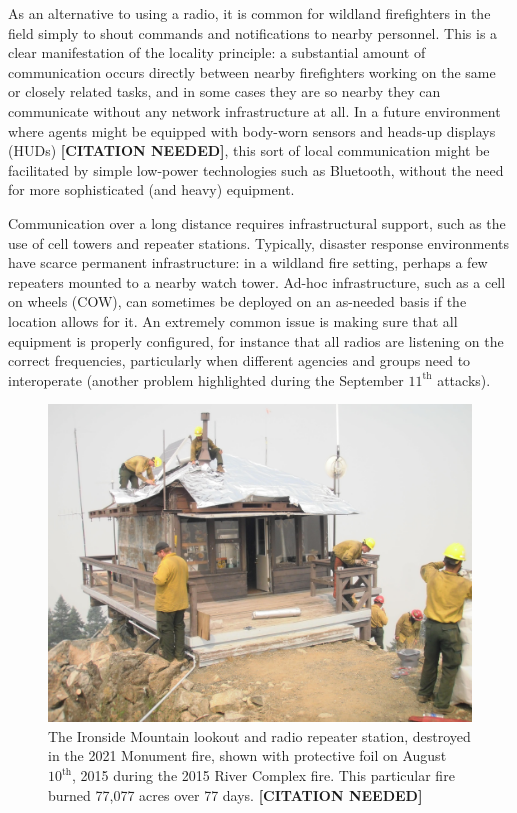 \documentclass[]             %
{NASA}                       %
\theoremstyle{definition}
\newcommand{\citationneeded}{\textbf{[CITATION NEEDED]}}
\begin{document}
As an alternative to using a radio, it is common for wildland
firefighters in the field simply to shout commands and notifications
to nearby personnel. This is a clear manifestation of the locality
principle: a substantial amount of communication occurs directly
between nearby firefighters working on the same or closely related
tasks, and in some cases they are so nearby they can communicate
without any network infrastructure at all. In a future environment
where agents might be equipped with body-worn sensors and heads-up
displays (HUDs) \citationneeded, this sort of local communication
might be facilitated by simple low-power technologies such as
Bluetooth, without the need for more sophisticated (and heavy)
equipment.

Communication over a long distance requires infrastructural support,
such as the use of cell towers and repeater stations. Typically,
disaster response environments have scarce permanent infrastructure:
in a wildland fire setting, perhaps a few repeaters mounted to a
nearby watch tower. Ad-hoc infrastructure, such as a cell on wheels
(COW), can sometimes be deployed on an as-needed basis if the location
allows for it. An extremely common issue is making sure that all
equipment is properly configured, for instance that all radios are
listening on the correct frequencies, particularly when different
agencies and groups need to interoperate (another problem highlighted
during the September $11^\textrm{th}$ attacks).

\begin{figure}[t]
  \centering
  \includegraphics[scale=0.085]{images/ironside.jpg}
  \caption{The Ironside Mountain lookout and radio repeater station, destroyed in the 2021
    Monument fire, shown with protective foil on August
    $10^\textrm{th}$, 2015 during the 2015 River Complex fire. This
    particular fire burned 77,077 acres over 77 days. \citationneeded}
  \label{fig:ironside}
\end{figure}
\end{document}
